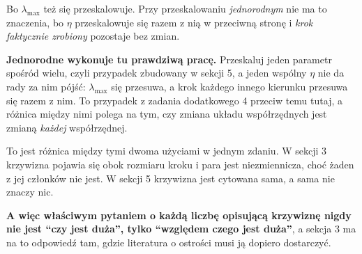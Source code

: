 \begin{fr}
\begin{ansblock}
Bo $\lambda_{\max}$ też się przeskalowuje. Przy przeskalowaniu
\emph{jednorodnym} nie ma to znaczenia, bo $\eta$ przeskalowuje się razem z nią
w przeciwną stronę i \emph{krok faktycznie zrobiony} pozostaje bez zmian.
\end{ansblock}

\textbf{Jednorodne wykonuje tu prawdziwą pracę.} Przeskaluj jeden parametr
spośród wielu, czyli przypadek zbudowany w sekcji 5, a jeden wspólny $\eta$ nie
da rady za nim pójść: $\lambda_{\max}$ się przesuwa, a krok każdego innego
kierunku przesuwa się razem z nim. To przypadek z zadania dodatkowego 4
przeciw temu tutaj, a różnica między nimi polega na tym, czy zmiana układu
współrzędnych jest zmianą \emph{każdej} współrzędnej.

To jest różnica między tymi dwoma użyciami w jednym zdaniu. W sekcji 3
krzywizna pojawia się obok rozmiaru kroku i para jest niezmiennicza, choć żaden
z jej członków nie jest. W sekcji 5 krzywizna jest cytowana sama, a sama nie
znaczy nic.

\textbf{A więc właściwym pytaniem o każdą liczbę opisującą krzywiznę nigdy nie
jest \enquote{czy jest duża}, tylko \enquote{względem czego jest duża}}, a
sekcja 3 ma na to odpowiedź tam, gdzie literatura o ostrości musi ją dopiero
dostarczyć.
\end{fr}

